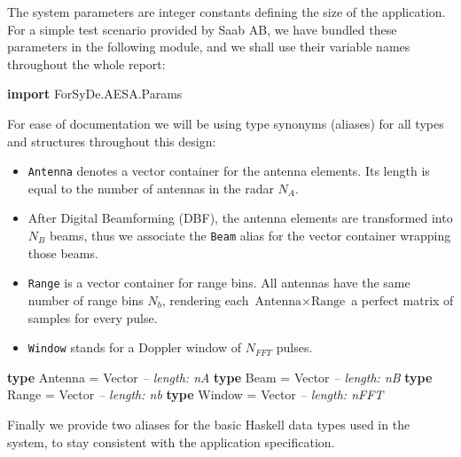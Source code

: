 \documentclass[
  a4paper,
]{article}
\newenvironment{Shaded}{}{}
\newcommand{\CommentTok}[1]{\textcolor[rgb]{0.38,0.63,0.69}{\textit{#1}}}
\newcommand{\DataTypeTok}[1]{\textcolor[rgb]{0.56,0.13,0.00}{#1}}
\newcommand{\FunctionTok}[1]{\textcolor[rgb]{0.02,0.16,0.49}{#1}}
\newcommand{\KeywordTok}[1]{\textcolor[rgb]{0.00,0.44,0.13}{\textbf{#1}}}
\begin{document}
The system parameters are integer constants defining the size of the
application. For a simple test scenario provided by Saab AB, we have
bundled these parameters in the following module, and we shall use their
variable names throughout the whole report:

\begin{Shaded}
\begin{Highlighting}[numbers=left,,firstnumber=74,]
\KeywordTok{import} \DataTypeTok{ForSyDe.AESA.Params}
\end{Highlighting}
\end{Shaded}

For ease of documentation we will be using type synonyms (aliases) for
all types and structures throughout this design:

\begin{itemize}
\item
  \texttt{Antenna} denotes a vector container for the antenna elements.
  Its length is equal to the number of antennas in the radar \(N_A\).
\item
  After Digital Beamforming (DBF), the antenna elements are transformed
  into \(N_B\) beams, thus we associate the \texttt{Beam} alias for the
  vector container wrapping those beams.
\item
  \texttt{Range} is a vector container for range bins. All antennas have
  the same number of range bins \(N_b\), rendering each
  \(\text{Antenna} \times \text{Range}\) a perfect matrix of samples for
  every pulse.
\item
  \texttt{Window} stands for a Doppler window of \(N_{FFT}\) pulses.
\end{itemize}

\begin{Shaded}
\begin{Highlighting}[numbers=left,,firstnumber=92,]
\KeywordTok{type} \DataTypeTok{Antenna}     \FunctionTok{=} \DataTypeTok{Vector} \CommentTok{-- length: nA}
\KeywordTok{type} \DataTypeTok{Beam}        \FunctionTok{=} \DataTypeTok{Vector} \CommentTok{-- length: nB}
\KeywordTok{type} \DataTypeTok{Range}       \FunctionTok{=} \DataTypeTok{Vector} \CommentTok{-- length: nb}
\KeywordTok{type} \DataTypeTok{Window}      \FunctionTok{=} \DataTypeTok{Vector} \CommentTok{-- length: nFFT}
\end{Highlighting}
\end{Shaded}

Finally we provide two aliases for the basic Haskell data types used in
the system, to stay consistent with the application specification.
\end{document}

